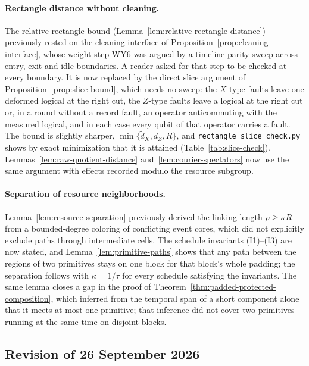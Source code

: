 \documentclass[aps,prx,reprint,superscriptaddress,nofootinbib,floatfix,longbibliography]{revtex4-2}
\theoremstyle{definition}
\begin{document}
\paragraph{Rectangle distance without cleaning.}
The relative rectangle bound (Lemma~\ref{lem:relative-rectangle-distance})
previously rested on the cleaning interface of
Proposition~\ref{prop:cleaning-interface}, whose weight step WY6 was argued
by a timeline-parity sweep across entry, exit and idle boundaries.  A reader
asked for that step to be checked at every boundary.  It is now replaced by
the direct slice argument of Proposition~\ref{prop:slice-bound}, which needs
no sweep: the $X$-type faults leave one deformed logical at the right cut,
the $Z$-type faults leave a logical at the right cut or, in a round without a
record fault, an operator anticommuting with the measured logical, and in
each case every qubit of that operator carries a fault.  The bound is
slightly sharper, $\min\{\widetilde d_X,d_Z,R\}$, and
\texttt{rectangle\_slice\_check.py} shows by exact minimization that it is
attained (Table~\ref{tab:slice-check}).  Lemmas~\ref{lem:raw-quotient-distance}
and~\ref{lem:courier-spectators} now use the same argument with effects
recorded modulo the resource subgroup.

\paragraph{Separation of resource neighborhoods.}
Lemma~\ref{lem:resource-separation} previously derived the linking length
$\rho\geq\kappa R$ from a bounded-degree coloring of conflicting event cores,
which did not explicitly exclude paths through intermediate cells.  The
schedule invariants (I1)--(I3) are now stated, and
Lemma~\ref{lem:primitive-paths} shows that any path between the regions of
two primitives stays on one block for that block's whole padding; the
separation follows with $\kappa=1/\tau$ for every schedule satisfying the
invariants.  The same lemma closes a gap in the proof of
Theorem~\ref{thm:padded-protected-composition}, which inferred from the
temporal span of a short component alone that it meets at most one
primitive; that inference did not cover two primitives running at the same
time on disjoint blocks.

\subsection{Revision of 26 September 2026}
\end{document}
